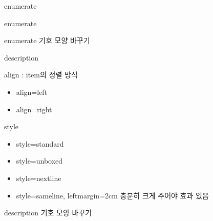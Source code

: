 \documentclass[ aspectratio=149,  14pt,blue,xcolor=pdftex,dvipsnames,table,handout,notes]{beamer}
\begin{document}
		\begin{frame}[t]{enumerate}

			\begin{block}{enumerate}
			\end{block}

			\begin{block}{enumerate 기호 모양 바꾸기}
			\end{block}


		\end{frame}


		\begin{frame}[t]{description}

			\begin{block}{align : item의 정렬 방식}
			\begin{itemize}
			\item align=left
			\item align=right
			\end{itemize}
			\end{block}

			\begin{block}{style}
			\begin{itemize}
			\item style=standard
			\item style=unboxed
			\item style=nextline
			\item style=sameline,  leftmargin=2cm 충분히 크게 주어야 효과 있음
			\end{itemize}
			\end{block}


			\begin{block}{description 기호 모양 바꾸기}
			\end{block}


		\end{frame}
\end{document}
